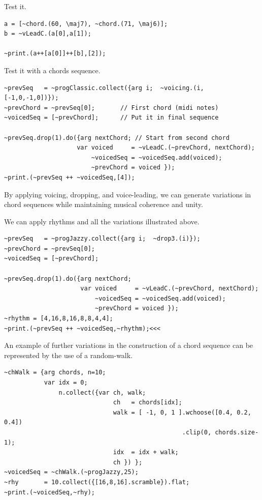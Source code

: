 Test it.

\begin{lstlisting}[frame=single] 
a = [~chord.(60, \maj7), ~chord.(71, \maj6)];
b = ~vLeadC.(a[0],a[1]);

~print.(a++[a[0]]++[b],[2]);
\end{lstlisting}

Test it with a chords sequence.

\begin{lstlisting}[frame=single] 
~prevSeq   = ~progClassic.collect({arg i;  ~voicing.(i, [-1,0,-1,0])}); 
~prevChord = ~prevSeq[0];       // First chord (midi notes)
~voicedSeq = [~prevChord];      // Put it in final sequence

~prevSeq.drop(1).do({arg nextChord; // Start from second chord
                    var voiced     = ~vLeadC.(~prevChord, nextChord); 
                        ~voicedSeq = ~voicedSeq.add(voiced);         
                        ~prevChord = voiced });
~print.(~prevSeq ++ ~voicedSeq,[4]);
\end{lstlisting}

By applying voicing, dropping, and voice-leading, we can generate variations in chord sequences while maintaining musical coherence and unity.

We can apply rhythms and all the variations illustrated above.

\begin{lstlisting}[frame=single] 
~prevSeq   = ~progJazzy.collect({arg i;  ~drop3.(i)}); 
~prevChord = ~prevSeq[0];      
~voicedSeq = [~prevChord];      

~prevSeq.drop(1).do({arg nextChord; 
                     var voiced     = ~vLeadC.(~prevChord, nextChord); 
                         ~voicedSeq = ~voicedSeq.add(voiced);         
                         ~prevChord = voiced });
~rhythm = [4,16,8,16,8,8,4,4];
~print.(~prevSeq ++ ~voicedSeq,~rhythm);<<<
\end{lstlisting}

An example of further variations in the construction of a chord sequence can be represented by the use of a random-walk.

\begin{lstlisting}[frame=single, caption=chord random walk model function] 
~chWalk = {arg chords, n=10;
           var idx = 0;
               n.collect({var ch, walk;               
                              ch   = chords[idx];
                              walk = [ -1, 0, 1 ].wchoose([0.4, 0.2, 0.4])
                                                 .clip(0, chords.size-1);
                              idx  = idx + walk;
                              ch }) };
~voicedSeq = ~chWalk.(~progJazzy,25);
~rhy       = 10.collect({[16,8,16].scramble}).flat;
~print.(~voicedSeq,~rhy);
\end{lstlisting}

